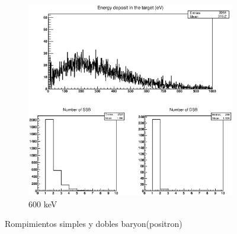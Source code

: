 \begin{figure}
\begin{subfigure}{.5\textwidth}
  \includegraphics[width=.78\linewidth]{./Figures/proton600kev.eps}
  \caption{600 keV}
  \label{fig:sub8}
\end{subfigure}
\caption[Rompimientos simples y dobles electrón(positron)]{Rompimientos simples y dobles baryon(positron)}
\label{fig:p}
\end{figure}



